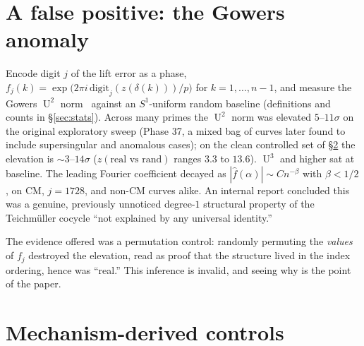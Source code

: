 \documentclass[11pt]{article}
\theoremstyle{definition}
\DeclareMathOperator{\Uk}{U}
\begin{document}
\section{A false positive: the Gowers anomaly}\label{sec:falsepos}

Encode digit $j$ of the lift error as a phase,
$f_j(k)=\exp\!\big(2\pi i\,\mathrm{digit}_j(z(\delta(k)))/p\big)$ for
$k=1,\dots,n-1$, and measure the Gowers $\Uk^2$ norm~\cite{taovu} against an
$S^1$-uniform random baseline (definitions and counts in
\S\ref{sec:stats}). Across many primes the $\Uk^2$ norm was elevated
$5$--$11\sigma$ on the original exploratory sweep (Phase 37, a mixed bag
of curves later found to include supersingular and anomalous cases); on
the clean controlled set of \S\ref{sec:controls} the elevation is
$\sim$$3$--$14\sigma$ ($z(\text{real vs rand})$ ranges $3.3$ to $13.6$).
$\Uk^3$ and higher sat at baseline. The leading Fourier
coefficient decayed as $|\hat f(\alpha)|\sim C n^{-\beta}$ with
$\beta<1/2$, on CM, $j{=}1728$, and non-CM curves alike. An internal
report concluded this was a genuine, previously unnoticed degree-$1$
structural property of the Teichm\"uller cocycle ``not explained by any
universal identity.''

The evidence offered was a permutation control: randomly permuting the
\emph{values} of $f_j$ destroyed the elevation, read as proof that the
structure lived in the index ordering, hence was ``real.'' This inference
is invalid, and seeing why is the point of the paper.

\section{Mechanism-derived controls}\label{sec:controls}
\end{document}
